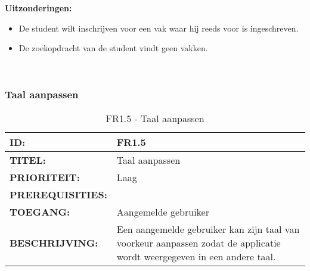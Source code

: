 \textbf{Uitzonderingen:}
\begin{itemize}
\item De student wilt inschrijven voor een vak waar hij reeds voor is ingeschreven.
\item De zoekopdracht van de student vindt geen vakken.

\end{itemize}
\
\subsubsection{Taal aanpassen}
\noindent\begin{table}[H]
            \begin{tabular}{l | p{10cm}}
                \textbf{ID:} & FR1.5 \\ \hline
                \textbf{TITEL:} & Taal aanpassen\\ \hline
                \textbf{PRIORITEIT:} &  Laag \\ \hline
                \textbf{PREREQUISITIES:} & \\ \hline
                \textbf{TOEGANG:} &  Aangemelde gebruiker \\ \hline
                \textbf{BESCHRIJVING:} & Een aangemelde gebruiker kan zijn taal van voorkeur aanpassen zodat de applicatie wordt weergegeven in een andere taal.\\
            \end{tabular}\\
            \caption{FR1.5 - Taal aanpassen}
            \label{tab:FR1.5 - Taal aanpassen}
        \end{table}
        

